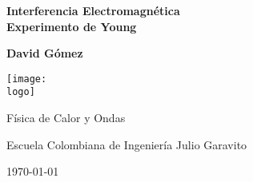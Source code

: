 \documentclass{article}
\newcommand{\logo}{"C:/Users/usuario/OneDrive/Documentos/U/logo-eci.png"}
\newcommand{\titlename}{Interferencia Electromagnética\\[10pt]
Experimento de Young}
\renewcommand{\author}{{David Gómez}}
\begin{document}
\begin{titlepage}
    \begin{center}
        \vspace{1cm}

        \textbf{\Huge{\titlename}}

        \vspace{1.5cm}

        \textbf{\large{\author}}

        \vspace{3cm}

        \texttt{[image: \\logo]}
        
        \vfill

        Física de Calor y Ondas

        Escuela Colombiana de Ingeniería Julio Garavito

        \today
    \end{center}
\end{titlepage}

\clearpage
\tableofcontents








\end{document}
